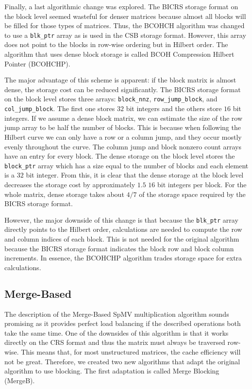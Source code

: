 \documentclass{siamart220329}
\begin{document}
Finally, a last algorithmic change was explored. The BICRS storage format on the block level seemed wasteful for denser matrices because almost all blocks will be filled for those types of matrices. Thus, the BCOHCH algorithm was changed to use a \texttt{blk\_ptr} array as is used in the CSB storage format. However, this array does not point to the blocks in row-wise ordering but in Hilbert order. The algorithm that uses dense block storage is called BCOH Compression Hilbert Pointer (BCOHCHP).

The major advantage of this scheme is apparent: if the block matrix is almost dense, the storage cost can be reduced significantly. The BICRS storage format on the block level stores three arrays: \texttt{block\_nnz}, \texttt{row\_jump\_block}, and \texttt{col\_jump\_block}. The first one stores $32$ bit integers and the others store $16$ bit integers. If we assume a dense block matrix, we can estimate the size of the row jump array to be half the number of blocks. This is because when following the Hilbert curve we can only have a row or a column jump, and they occur mostly evenly throughout the curve. The column jump and block nonzero count arrays have an entry for every block. The dense storage on the block level stores the \texttt{block\_ptr} array which has a size equal to the number of blocks and each element is a $32$ bit integer. From this, it is clear that the dense storage at the block level decreases the storage cost by approximately $1.5$ $16$ bit integers per block. For the whole matrix, dense storage takes about $4/7$ of the storage space required by the BICRS storage format.

However, the major downside of this change is that because the \texttt{blk\_ptr} array directly points to the Hilbert order, calculations are needed to compute the row and column indices of each block. This is not needed for the original algorithm because the BICRS storage format indicates the block row and block column increments. In essence, the BCOHCHP algorithm trades storage space for extra calculations.

\subsection{Merge-Based}
The description of the Merge-Based SpMV multiplication algorithm sounds promising as it provides perfect load balancing if the described operations both take the same time. One of the downsides of this algorithm is that it works directly on the CRS format and thus the matrix must always be traversed row-wise. This means that, for most unstructured matrices, the cache efficiency will not be great. Therefore, we created two new algorithms that adapt the original algorithm to use blocking. The first adaptation is called Merge Blocking (MergeB).
\end{document}
